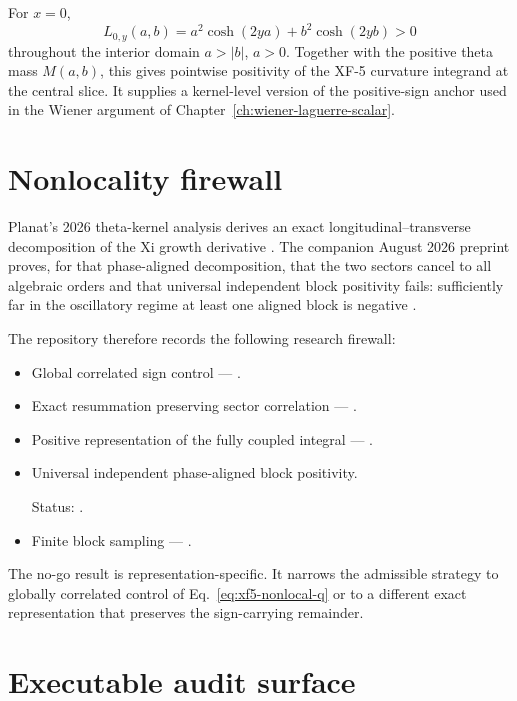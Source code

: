 For $x=0$,
\begin{equation}\label{eq:xf5-xzero-kernel}
L_{0,y}(a,b)
=a^2\cosh(2ya)+b^2\cosh(2yb)>0
\end{equation}
throughout the interior domain $a>|b|$, $a>0$.  Together with the positive theta mass $M(a,b)$, this gives pointwise positivity of the XF-5 curvature integrand at the central slice.  It supplies a kernel-level version of the positive-sign anchor used in the Wiener argument of Chapter~\ref{ch:wiener-laguerre-scalar}.

\section{Nonlocality firewall}

Planat's 2026 theta-kernel analysis derives an exact longitudinal--transverse decomposition of the Xi growth derivative \cite{Planat2026Theta}.  The companion August 2026 preprint proves, for that phase-aligned decomposition, that the two sectors cancel to all algebraic orders and that universal independent block positivity fails: sufficiently far in the oscillatory regime at least one aligned block is negative \cite{Planat2026Nonlocal}.

The repository therefore records the following research firewall:
\begin{itemize}
\item Global correlated sign control --- .
\item Exact resummation preserving sector correlation --- .
\item Positive representation of the fully coupled integral --- .
\item Universal independent phase-aligned block positivity.\par\noindent Status: .
\item Finite block sampling --- .
\end{itemize}
The no-go result is representation-specific.  It narrows the admissible strategy to globally correlated control of Eq.~\eqref{eq:xf5-nonlocal-q} or to a different exact representation that preserves the sign-carrying remainder.

\section{Executable audit surface}

